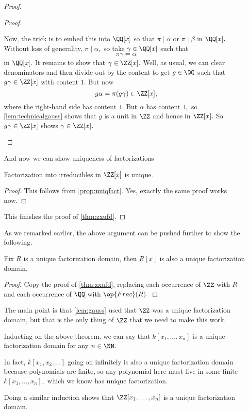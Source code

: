 \begin{proof}
\begin{proof}
\begin{itemize}
			Now, the trick is to embed this into $\QQ[x]$ so that $\pi\mid\alpha$ or $\pi\mid\beta$ in $\QQ[x].$ Without loss of generality, $\pi\mid\alpha,$ so take $\gamma\in\QQ[x]$ such that
			\[\pi\gamma=\alpha\]
			in $\QQ[x].$ It remains to show that $\gamma\in\ZZ[x].$ Well, as usual, we can clear denominators and then divide out by the content to get $g\in\QQ$ such that $g\gamma\in\ZZ[x]$ with content $1.$ But now
			\[g\alpha=\pi(g\gamma)\in\ZZ[x],\]
			where the right-hand side has content $1.$ But $\alpha$ has content $1,$ so \autoref{lem:technicalgauss} shows that $g$ is a unit in $\ZZ$ and hence in $\ZZ[x].$ So $g\gamma\in\ZZ[x]$ shows $\gamma\in\ZZ[x].$
			\qedhere
		\end{itemize}
	\end{proof}
	And now we can show uniqueness of factorizations
	\begin{lemma}
		Factorization into irreducibles in $\ZZ[x]$ is unique.
	\end{lemma}
	\begin{proof}
		This follows from \autoref{prop:uniqfact}. Yes, exactly the same proof works now.
	\end{proof}
	This finishes the proof of \autoref{thm:zxufd}.
\end{proof}
As we remarked earlier, the above argument can be pushed further to show the following.
\begin{theorem}
	Fix $R$ is a unique factorization domain, then $R[x]$ is also a unique factorization domain.
\end{theorem}
\begin{proof}
	Copy the proof of \autoref{thm:zxufd}, replacing each occurrence of $\ZZ$ with $R$ and each occurrence of $\QQ$ with $\op{Frac}(R).$
\end{proof}
The main point is that \autoref{lem:gauss} used that $\ZZ$ was a unique factorization domain, but that is the only thing of $\ZZ$ that we need to make this work.
\begin{example}
	Inducting on the above theorem, we can say that $k[x_1,\ldots,x_n]$ is a unique factorization domain for any $n\in\NN.$
\end{example}
\begin{example}
	In fact, $k[x_1,x_2,\ldots]$ going on infinitely is also a unique factorization domain because polynomials are finite, so any polynomial here must live in some finite $k[x_1,\ldots,x_n],$ which we know has unique factorization.
\end{example}
\begin{example}
	Doing a similar induction shows that $\ZZ[x_1,\ldots,x_n]$ is a unique factorization domain.
\end{example}

